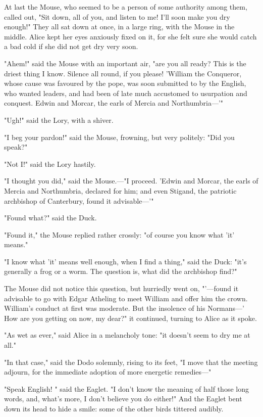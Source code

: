 At last the Mouse, who seemed to be a person of some authority among them, called out, "Sit down, all of you, and listen to me! I'll soon make you dry enough!" They all sat down at once, in a large ring, with the Mouse in the middle. Alice kept her eyes anxiously fixed on it, for she felt sure she would catch a bad cold if she did not get dry very soon.

"Ahem!" said the Mouse with an important air, "are you all ready? This is the driest thing I know. Silence all round, if you please! 'William the Conqueror, whose cause was ​favoured by the pope, was soon submitted to by the English, who wanted leaders, and had been of late much accustomed to usurpation and conquest. Edwin and Morcar, the earls of Mercia and Northumbria—'"

"Ugh!" said the Lory, with a shiver.

"I beg your pardon!" said the Mouse, frowning, but very politely: "Did you speak?"

"Not I!" said the Lory hastily.

"I thought you did," said the Mouse.—"I proceed. 'Edwin and Morcar, the earls of Mercia and Northumbria, declared for him; and even Stigand, the patriotic archbishop of Canterbury, found it advisable—'"

"Found what?" said the Duck.

"Found it," the Mouse replied rather crossly: "of course you know what 'it' means."

"I know what 'it' means well enough, when I find a thing," said the Duck: "it's generally a frog or a worm. The question is, what did the archbishop find?"

The Mouse did not notice this question, but ​hurriedly went on, "'—found it advisable to go with Edgar Atheling to meet William and offer him the crown. William's conduct at first was moderate. But the insolence of his Normans—' How are you getting on now, my dear?" it continued, turning to Alice as it spoke.

"As wet as ever," said Alice in a melancholy tone: "it doesn't seem to dry me at all."

"In that case," said the Dodo solemnly, rising to its feet, "I move that the meeting adjourn, for the immediate adoption of more energetic remedies—"

"Speak English! " said the Eaglet. "I don't know the meaning of half those long words, and, what's more, I don't believe you do either!" And the Eaglet bent down its head to hide a smile: some of the other birds tittered audibly.

